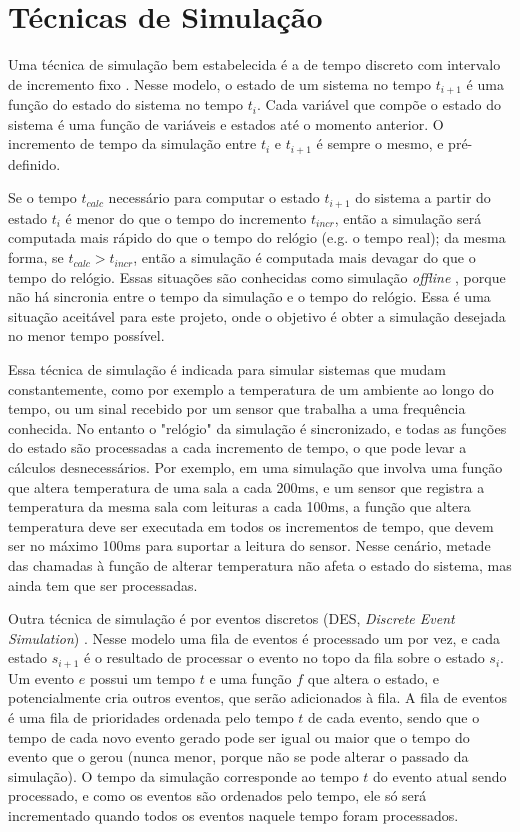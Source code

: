\section{Técnicas de Simulação}
\label{sec:simulation_techniques}

Uma técnica de simulação bem estabelecida é a de tempo discreto com intervalo de incremento fixo \cite{belanger2010aboutsimulation}. Nesse modelo, o estado de um sistema no tempo $t_{i+1}$ é uma função do estado do sistema no tempo $t_i$. Cada variável que compõe o estado do sistema é uma função de variáveis e estados até o momento anterior. O incremento de tempo da simulação entre $t_i$ e $t_{i+1}$ é sempre o mesmo, e pré-definido.

Se o tempo $t_{calc}$ necessário para computar o estado $t_{i+1}$ do sistema a partir do estado $t_i$ é menor do que o tempo do incremento $t_{incr}$, então a simulação será computada mais rápido do que o tempo do relógio (e.g. o tempo real); da mesma forma, se $t_{calc} > t_{incr}$, então a simulação é computada mais devagar do que o tempo do relógio. Essas situações são conhecidas como simulação \textit{offline} \cite{belanger2010aboutsimulation}, porque não há sincronia entre o tempo da simulação e o tempo do relógio. Essa é uma situação aceitável para este projeto, onde o objetivo é obter a simulação desejada no menor tempo possível.

Essa técnica de simulação é indicada para simular sistemas que mudam constantemente, como por exemplo a temperatura de um ambiente ao longo do tempo, ou um sinal recebido por um sensor que trabalha a uma frequência conhecida. No entanto o  "relógio" da simulação é sincronizado, e todas as funções do estado são processadas a cada incremento de tempo, o que pode levar a cálculos desnecessários. Por exemplo, em uma simulação que involva uma função que altera temperatura de uma sala a cada 200ms, e um sensor que registra a temperatura da mesma sala com leituras a cada 100ms, a função que altera temperatura deve ser executada em todos os incrementos de tempo, que devem ser no máximo 100ms para suportar a leitura do sensor. Nesse cenário, metade das chamadas à função de alterar temperatura não afeta o estado do sistema, mas ainda tem que ser processadas.

Outra técnica de simulação é por eventos discretos (DES, \textit{Discrete Event Simulation}) \cite{matloff2008desintro}. Nesse modelo uma fila de eventos é processado um por vez, e cada estado $s_{i+1}$ é o resultado de processar o evento no topo da fila sobre o estado $s_i$. Um evento $e$ possui um tempo $t$ e uma função $f$ que altera o estado, e potencialmente cria outros eventos, que serão adicionados à fila. A fila de eventos é uma fila de prioridades ordenada pelo tempo $t$ de cada evento, sendo que o tempo de cada novo evento gerado pode ser igual ou maior que o tempo do evento que o gerou (nunca menor, porque não se pode alterar o passado da simulação). O tempo da simulação corresponde ao tempo $t$ do evento atual sendo processado, e como os eventos são ordenados pelo tempo, ele só será incrementado quando todos os eventos naquele tempo foram processados.

